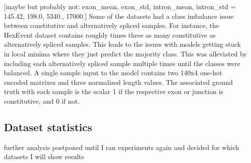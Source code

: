 [maybe but probably not: exon_mean, exon_std, intron_mean, intron_std = 145.42, 198.0, 5340., 17000.]
Some of the datasets had a class imbalance issue between constitutive and alternatively spliced samples. For instance, the HexEvent dataset contains roughly times three as many constitutive as alternatively spliced samples. This leads to the issues with models getting stuck in local minima where they just predict the majority class. This was alleviated by including each alternatively spliced sample multiple times until the classes were balanced.
A single sample input to the model contains two 140x4 one-hot encoded matrixes and three normalized length values. The associated ground truth with each sample is the scalar 1 if the respective exon or junction is constitutive, and 0 if not.
\subsection{Dataset statistics} \cite{subsec:datasetstatistics}

further analysis postponed until I ran experiments again and decided for which datasets I will show results 

